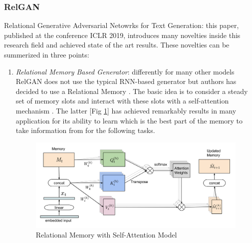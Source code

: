 \subsubsection[RelGAN]{RelGAN \cite{RelGAN}}
Relational Generative Adversarial Netowrks for Text Generation: this paper, published at the conference ICLR 2019, introduces many novelties inside this research field and achieved state of the art results. These novelties can be summerized in three points:
\begin{enumerate}
	\item \textit{Relational Memory Based Generator}: differently for many other models RelGAN does not use the typical RNN-based generator but authors has decided to use a Relational Memory \cite{Santoro}. The basic idea is to consider a steady set of memory slots and interact with these slots with a self-attention mechanism \cite{Vaswani}. The latter [Fig \ref{img:RelationalMemory}] has achieved remarkably results in many application for its ability to learn which is the best part of the memory to take information from for the following tasks.
	
	\begin{figure}[h!]
		\centering
		\includegraphics[width=0.8\linewidth]{Images/RelationalMemorySelfAttention.png}
		\caption{Relational Memory with Self-Attention Model}
		\label{img:RelationalMemory}
	\end{figure}
	

\end{enumerate}
